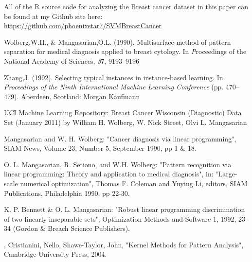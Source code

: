 \documentclass[conference]{IEEEtran}
\begin{document}
All of the R source code for analyzing the Breast cancer dataset in this paper can be found at my Github site here: 
\href{https://github.com/phoenixstar7/SVMBreastCancer}{https://github.com/phoenixstar7/SVMBreastCancer}


%

\begin{thebibliography}{1}

Wolberg,W.H., \& Mangasarian,O.L. (1990). Multisurface method of 
      pattern separation for medical diagnosis applied to breast cytology. In
      {\textit Proceedings of the National Academy of Sciences}, {\textit 87},
      9193--9196

Zhang,J. (1992). Selecting typical instances in instance-based
      learning.  In {\textit{ Proceedings of the Ninth International Machine
      Learning Conference}} (pp. 470--479).  Aberdeen, Scotland: Morgan
      Kaufmann

UCI Machine Learning Repository: Breast Cancer Wisconsin (Diagnostic) Data Set (January 2011) by William H. Wolberg, W. Nick Street, Olvi L. Mangasarian

Mangasarian and W. H. Wolberg: "Cancer diagnosis via linear 
      programming", SIAM News, Volume 23, Number 5, September 1990, pp 1 \& 18.

O. L. Mangasarian, R. Setiono, and W.H. Wolberg: "Pattern recognition 
      via linear programming: Theory and application to medical diagnosis", 
      in: "Large-scale numerical optimization", Thomas F. Coleman and Yuying
      Li, editors, SIAM Publications, Philadelphia 1990, pp 22-30.

K. P. Bennett \& O. L. Mangasarian: "Robust linear programming 
      discrimination of two linearly inseparable sets", Optimization Methods
      and Software 1, 1992, 23-34 (Gordon \& Breach Science Publishers).
      
,
Cristianini, Nello, Shawe-Taylor, John, "Kernel Methods for Pattern Analysis",
Cambridge University Press, 2004.


\end{thebibliography}
\end{document}

